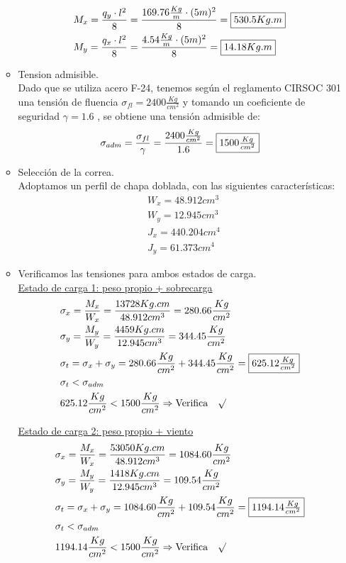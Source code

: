 \begin{enumerate}
\begin{itemize}
\begin{align*}
& M_x= \frac{q_y \cdot l^2}{8} = \frac{169.76 \frac{Kg}{m} \cdot (5m)^2}{8} = \framebox{$530.5 Kg.m$} \\
& M_y= \frac{q_x \cdot l^2}{8} = \frac{4.54 \frac{Kg}{m} \cdot (5m)^2}{8} = \framebox{$14.18 Kg.m$}
\end{align*}

\item Tension admisible.\\
Dado que se utiliza acero F-24, tenemos según el reglamento CIRSOC 301 una tensión de fluencia $\sigma_{fl}=2400 \frac{Kg}{cm^2}$ y tomando un coeficiente de seguridad $\gamma = 1.6$ , se obtiene una tensión admisible de:
$$\sigma_{adm}= \frac{\sigma_{fl}}{\gamma} = \frac{2400 \frac{Kg}{cm^2}}{1.6} = \framebox{$1500 \frac{Kg}{cm^2}$}$$

\newpage
\item Selección de la correa.\\
Adoptamos un perfil  de chapa doblada, con las siguientes características:
\begin{align*}
& W_x= 48.912 cm^3 \\
& W_y= 12.945 cm^3 \\
& J_x= 440.204 cm^4 \\
& J_y= 61.373 cm^4
\end{align*}

\item Verificamos las tensiones para ambos estados de carga.\\
\underline{Estado de carga 1: peso propio + sobrecarga}
\begin{align*}
& \sigma_x=\frac{M_x}{W_x} = \frac{13728 Kg.cm}{48.912 cm^3} = 280.66 \frac{Kg}{cm^2}\\
& \sigma_y=\frac{M_y}{W_y} = \frac{4459 Kg.cm}{12.945 cm^3} = 344.45 \frac{Kg}{cm^2}\\
& \sigma_t= \sigma_x + \sigma_y = 280.66 \frac{Kg}{cm^2} + 344.45 \frac{Kg}{cm^2} = \framebox{$625.12 \frac{Kg}{cm^2}$}\\
& \sigma_t < \sigma_{adm}\\
& 625.12 \frac{Kg}{cm^2} < 1500 \frac{Kg}{cm^2} \Rightarrow \text{Verifica} \quad \surd
\end{align*}

\underline{Estado de carga 2: peso propio + viento}
\begin{align*}
& \sigma_x=\frac{M_x}{W_x} = \frac{53050 Kg.cm}{48.912 cm^3} = 1084.60 \frac{Kg}{cm^2}\\
& \sigma_y=\frac{M_y}{W_y} = \frac{1418 Kg.cm}{12.945 cm^3} = 109.54 \frac{Kg}{cm^2}\\
& \sigma_t= \sigma_x + \sigma_y = 1084.60 \frac{Kg}{cm^2} + 109.54 \frac{Kg}{cm^2} = \framebox{$1194.14 \frac{Kg}{cm^2}$}\\
& \sigma_t < \sigma_{adm}\\
& 1194.14 \frac{Kg}{cm^2} < 1500 \frac{Kg}{cm^2} \Rightarrow \text{Verifica} \quad \surd
\end{align*}


\end{itemize}
\end{enumerate}
